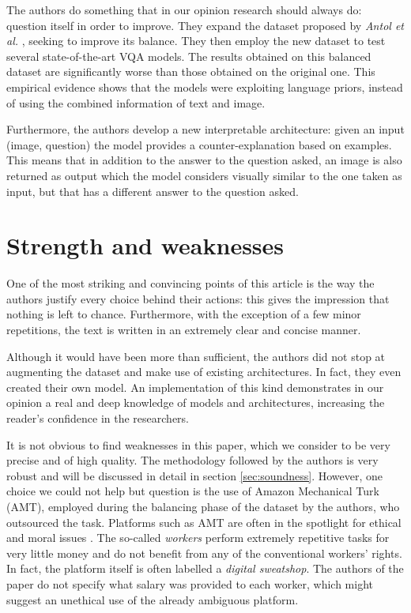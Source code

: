 \documentclass[letterpaper,11pt]{article}
\begin{document}
The authors do something that in our opinion research should always do: question itself in order to improve. They expand the dataset proposed by \textit{Antol et al.} \cite{antol2015vqa}, seeking to improve its balance. They then employ the new dataset to test several state-of-the-art VQA models. The results obtained on this balanced dataset are significantly worse than those obtained on the original one. This empirical evidence shows that the models were exploiting language priors, instead of using the combined information of text and image. 

Furthermore, the authors develop a new interpretable architecture: given an input (image, question) the model provides a counter-explanation based on examples. This means that in addition to the answer to the question asked, an image is also returned as output which the model considers visually similar to the one taken as input, but that has a different answer to the question asked.


\section{Strength and weaknesses}
\label{sec:procons}

One of the most striking and convincing points of this article is the way the authors justify every choice behind their actions: this gives the impression that nothing is left to chance. Furthermore, with the exception of a few minor repetitions, the text is written in an extremely clear and concise manner.

Although it would have been more than sufficient, the authors did not stop at augmenting the dataset and make use of existing architectures. In fact, they even created their own model. An implementation of this kind demonstrates in our opinion a real and deep knowledge of models and architectures, increasing the reader's confidence in the researchers.

It is not obvious to find weaknesses in this paper, which we consider to be very precise and of high quality. The methodology followed by the authors is very robust and will be discussed in detail in section \ref{sec:soundness}. However, one choice we could not help but question is the use of Amazon Mechanical Turk (AMT), employed during the balancing phase of the dataset by the authors, who outsourced the task. Platforms such as AMT are often in the spotlight for ethical and moral issues \cite{fort2011amazon}. The so-called \textit{workers} perform extremely repetitive tasks for very little money and do not benefit from any of the conventional workers' rights. In fact, the platform itself is often labelled a \textit{digital sweatshop}. The authors of the paper do not specify what salary was provided to each worker, which might suggest an unethical use of the already ambiguous platform.
\end{document}
